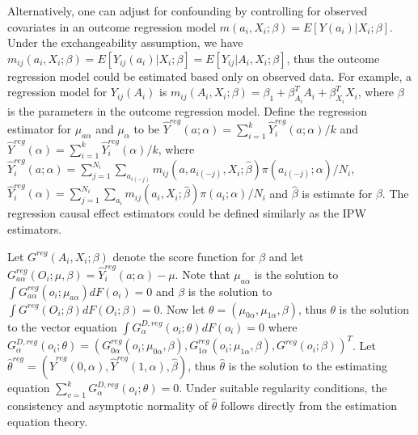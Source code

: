 \documentclass[oupdraft]{biostatistics}
\begin{document}
Alternatively, one can adjust for confounding by controlling for observed covariates in an outcome regression model $m(a_i,X_i;\beta)=E[Y(a_i)|X_i;\beta]$. Under the exchangeability assumption, we have $ m_{ij}(a_i,X_i;\beta)=E[Y_{ij}(a_i)|X_i;\beta]=E[Y_{ij}|A_i,X_i;\beta]$, thus the outcome regression model could be estimated based only on observed data. For example, a regression model for $Y_{ij}(A_i)$ is $m_{ij}(A_i,X_i;\beta)=\beta_1+\beta_{A_i}^{T}A_i+\beta_{X_i}^{T}X_i$, where $\beta$ is the parameters in the outcome regression model. Define the regression estimator for $\mu_{a\alpha}$ and $\mu_{\alpha}$ to be  $\widehat{Y}^{reg}(a;\alpha)=\sum_{i=1}^k\widehat{Y}_i^{reg}(a;\alpha)/k$ and $\widehat{Y}^{reg}(\alpha)=\sum_{i=1}^k\widehat{Y}_i^{reg}(\alpha)/k$, where $\widehat{Y}_i^{reg}(a;\alpha)=\sum_{j=1}^{N_i}\sum_{a_{i(-j)}}m_{ij}(a,a_{i(-j)},X_i;\hat\beta)\pi(a_{i(-j)};\alpha)/N_i$, $\widehat{Y}^{reg}_i(\alpha)=\sum_{j=1}^{N_i}\sum_{a_i}m_{ij}(a_i,X_i;\hat\beta)\pi(a_i;\alpha)/N_i$ and $\hat{\beta}$ is estimate for $\beta$. The regression causal effect estimators could be defined similarly as the IPW estimators.


Let $G^{reg}(A_i,X_i;\beta)$ denote the score function for $\beta$ and let $G^{reg}_{a\alpha}(O_i;\mu,\beta) =\widehat{Y}_i^{reg}(a;\alpha)- \mu$. Note that $\mu_{a\alpha}$ is the solution to $\int G^{reg}_{a\alpha}(o_i;\mu_{a\alpha}) dF(o_i) = 0$ and $\beta$ is the solution to $\int G^{reg}(O_i;\beta)dF(O_i;\beta)=0$. Now let $\theta=(\mu_{0\alpha},\mu_{1\alpha},\beta)$, thus $\theta$ is the solution to the vector equation $\int G^{ D, reg}_{\alpha}(o_i;\theta) dF(o_i) = 0$ where $G^{ D,reg}_{\alpha}(o_i;\theta)=(G^{reg}_{0\alpha}(o_i;\mu_{0\alpha},\beta),G^{reg}_{1\alpha}(o_i;\mu_{1\alpha},\beta),G^{reg}(o_i;\beta))^T$. Let $\hat\theta^{reg}=(\hat Y^{reg}(0,\alpha),\hat Y^{reg}(1,\alpha),\hat\beta)$, thus $\hat \theta$ is the solution to the estimating equation $\sum_{v=1}^k G^{D,reg}_{\alpha}(o_i;\theta)=0$. Under suitable regularity conditions, the consistency and asymptotic normality of $\hat\theta$ follows directly from the estimation equation theory. 

\end{document}
